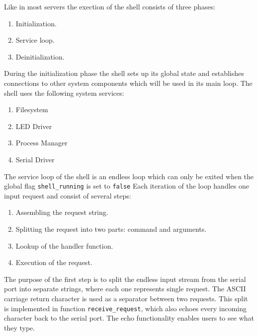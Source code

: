 \documentclass[a4paper,10pt]{article}
\begin{document}
Like in most servers the exection of the shell consists of three phases:
\begin{enumerate}
	\item Initialization.
	\item Service loop.
	\item Deinitialization.
\end{enumerate}

During the initialization phase the shell sets up its global state and establishes connections to other system components which will be used in its main loop.
The shell uses the following system services:
\begin{enumerate}
	\item Filesystem
	\item LED Driver
	\item Process Manager
	\item Serial Driver
\end{enumerate}

The service loop of the shell is an endless loop which can only be exited when the global flag \lstinline!shell_running! is set to \lstinline!false!
Each iteration of the loop handles one input request and consist of several steps:
\begin{enumerate}
	\item Assembling the request string.
	\item Splitting the request into two parts: command and arguments.
	\item Lookup of the handler function.
	\item Execution of the request.
\end{enumerate} 

The purpose of the first step is to split the endless input stream from the serial port into separate strings, where each one represents single request.
The ASCII carriage return character is used as a separator between two requests.
This split is implemented in function \lstinline!receive_request!, which also echoes every incoming character back to the serial port.
The echo functionality enables users to see what they type.
\end{document}
